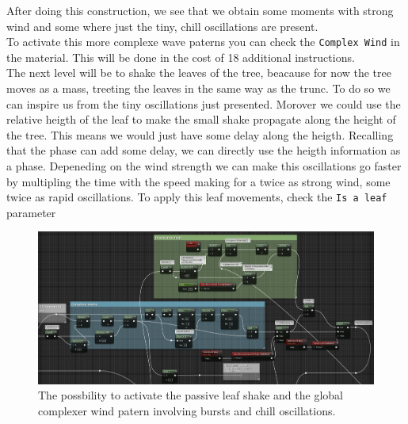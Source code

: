 \documentclass[../main.tex]{subfile}
\begin{document}
After doing this construction, we see that we obtain some moments with strong wind and some where just the tiny, chill oscillations are present.\\
To activate this more complexe wave paterns you can check the \texttt{Complex Wind} in the material. This will be done in the cost of 18 additional instructions.\\

The next level will be to shake the leaves of the tree, beacause for now the tree moves as a mass, treeting the leaves in the same way as the trunc. To do so
we can inspire us from the tiny oscillations just presented. Morover we could use the relative heigth of the leaf to make the small shake propagate along the height of the tree.
This means we would just have some delay along the heigth. 
Recalling that the phase can add some delay, we can directly use the heigth information as a phase. Depeneding on the wind strength we can make
this oscillations go faster by multipling the time with the speed making for a twice as strong wind, some twice as rapid oscillations. To apply this leaf
movements, check the \texttt{Is a leaf} parameter\\
\begin{figure}[H]
    \centering
    \includegraphics[width=1\textwidth]{Ressources/ComplexeWave.png}
    \caption{The possbility to activate the passive leaf shake and the global complexer wind patern involving bursts and chill oscillations.}
\end{figure}
\end{document}

